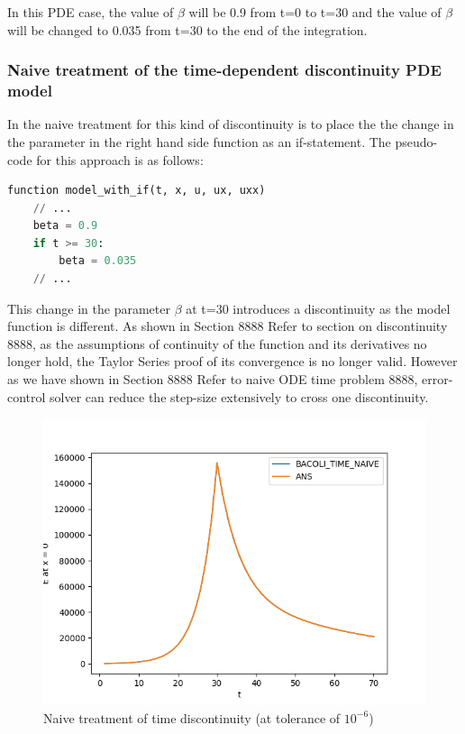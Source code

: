 \documentclass{article}
\begin{document}
In this PDE case, the value of $\beta$ will be 0.9 from t=0 to t=30 and the value of $\beta$ will be changed to 0.035 from t=30 to the end of the integration.

\subsubsection{Naive treatment of the time-dependent discontinuity PDE model}
\label{subsubsection:pde_time_naive}
In the naive treatment for this kind of discontinuity is to place the the change in the parameter in the right hand side function as an if-statement. The pseudo-code for this approach is as follows:

\begin{minipage}{\linewidth}
\begin{lstlisting}[language=Python]
function model_with_if(t, x, u, ux, uxx)
    // ...
    beta = 0.9
    if t >= 30:
        beta = 0.035
    // ...

\end{lstlisting}
\end{minipage}

This change in the parameter $\beta$ at t=30 introduces a discontinuity as the model function is different. As shown in Section 8888 Refer to section on discontinuity 8888, as the assumptions of continuity of the function and its derivatives no longer hold, the Taylor Series proof of its convergence is no longer valid. However as we have shown in Section 8888 Refer to naive ODE time problem 8888, error-control solver can reduce the step-size extensively to cross one discontinuity.


\begin{figure}[H]
\centering
\includegraphics[width=0.7\linewidth]{./figures/pde_time_disc_naive}
\caption{Naive treatment of time discontinuity (at tolerance of $10^{-6}$)}
\label{fig:pde_time_disc_naive}
\end{figure}
\end{document}

